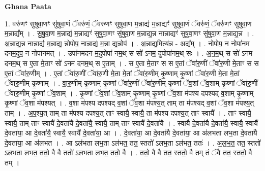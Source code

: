 \documentclass[17pt]{extarticle}
\begin{document}
\textbf{Ghana Paata } \newline

1. वरु॑णꣳ सुषुवा॒णꣳ सु॑षुवा॒णं ॅवरु॑णं॒ ॅवरु॑णꣳ सुषुवा॒ण म॒न्नाद्य॑ म॒न्नाद्यꣳ॑ सुषुवा॒णं ॅवरु॑णं॒ ॅवरु॑णꣳ सुषुवा॒ण म॒न्नाद्य᳚म् । . सु॒षु॒वा॒ण म॒न्नाद्य॑ म॒न्नाद्यꣳ॑ सुषुवा॒णꣳ सु॑षुवा॒ण म॒न्नाद्य॒न्न नान्नाद्यꣳ॑ सुषुवा॒णꣳ सु॑षुवा॒ण म॒न्नाद्य॒न्न । . अ॒न्नाद्य॒न्न नान्नाद्य॑ म॒न्नाद्य॒ न्नोपोप॒ नान्नाद्य॑ म॒न्ना द्य॒न्नोप॑ । . अ॒न्नाद्य॒मित्य॑न्न - अद्य᳚म् । . नोपोप॒ न नोपा॑नम दनम॒दुप॒ न नोपा॑नमत् । . उपा॑नमदन म॒दुपोपा॑ नम॒थ् स सो॑ ऽनम॒ दुपोपा॑नम॒थ् सः । . अ॒न॒म॒थ् स सो॑ ऽनम दनम॒थ् स ए॒ता मे॒ताꣳ सो॑ ऽनम दनम॒थ् स ए॒ताम् । . स ए॒ता मे॒ताꣳ स स ए॒तां ॅवा॑रु॒णीं ॅवा॑रु॒णी मे॒ताꣳ स स ए॒तां ॅवा॑रु॒णीम् । . ए॒तां ॅवा॑रु॒णीं ॅवा॑रु॒णी मे॒ता मे॒तां ॅवा॑रु॒णीम् कृ॒ष्णाम् कृ॒ष्णां ॅवा॑रु॒णी मे॒ता मे॒तां ॅवा॑रु॒णीम् कृ॒ष्णाम् । . वा॒रु॒णीम् कृ॒ष्णाम् कृ॒ष्णां ॅवा॑रु॒णीं ॅवा॑रु॒णीम् कृ॒ष्णां ॅव॒शां ॅव॒शाम् कृ॒ष्णां ॅवा॑रु॒णीं ॅवा॑रु॒णीम् कृ॒ष्णां ॅव॒शाम् । . कृ॒ष्णां ॅव॒शां ॅव॒शाम् कृ॒ष्णाम् कृ॒ष्णां ॅव॒शा म॑पश्य दपश्यद् व॒शाम् कृ॒ष्णाम् कृ॒ष्णां ॅव॒शा म॑पश्यत् । . व॒शा म॑पश्य दपश्यद् व॒शां ॅव॒शा म॑पश्य॒त् ताम् ता म॑पश्यद् व॒शां ॅव॒शा म॑पश्य॒त् ताम् । . अ॒प॒श्य॒त् ताम् ता म॑पश्य दपश्य॒त् ताꣳ स्वायै॒ स्वायै॒ ता म॑पश्य दपश्य॒त् ताꣳ स्वायै᳚ । . ताꣳ स्वायै॒ स्वायै॒ ताम् ताꣳ स्वायै॑ दे॒वता॑यै दे॒वता॑यै॒ स्वायै॒ ताम् ताꣳ स्वायै॑ दे॒वता॑यै । . स्वायै॑ दे॒वता॑यै दे॒वता॑यै॒ स्वायै॒ स्वायै॑ दे॒वता॑या॒ आ दे॒वता॑यै॒ स्वायै॒ स्वायै॑ दे॒वता॑या॒ आ । . दे॒वता॑या॒ आ दे॒वता॑यै दे॒वता॑या॒ आ अ॑लभता लभ॒ता दे॒वता॑यै दे॒वता॑या॒ आ अ॑लभत । . आ ऽल॑भता लभ॒ता ऽल॑भत॒ तत॒ स्ततो॑ ऽलभ॒ता ऽल॑भत॒ ततः॑ । . अ॒ल॒भ॒त॒ तत॒ स्ततो॑ ऽलभता लभत॒ ततो॒ वै वै ततो॑ ऽलभता लभत॒ ततो॒ वै । . ततो॒ वै वै तत॒ स्ततो॒ वै तम् तं ॅवै तत॒ स्ततो॒ वै तम् । \newline
\end{document}
